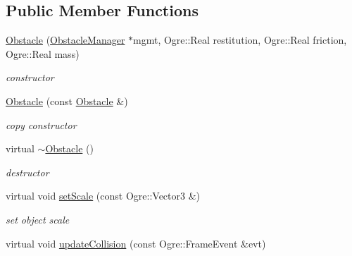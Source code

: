 \subsection*{Public Member Functions}
\begin{DoxyCompactItemize}
\item 
\hyperlink{class_n_c_t_u_1_1_obstacle_abc03dea67c7426eea315a1ac4da8c78d}{Obstacle} (\hyperlink{class_n_c_t_u_1_1_obstacle_manager}{Obstacle\+Manager} $\ast$mgmt, Ogre\+::\+Real restitution, Ogre\+::\+Real friction, Ogre\+::\+Real mass)\hypertarget{class_n_c_t_u_1_1_obstacle_abc03dea67c7426eea315a1ac4da8c78d}{}\label{class_n_c_t_u_1_1_obstacle_abc03dea67c7426eea315a1ac4da8c78d}

\begin{DoxyCompactList}\small\item\em constructor \end{DoxyCompactList}\item 
\hyperlink{class_n_c_t_u_1_1_obstacle_af96593944da2a5873cdacbd8ff54f076}{Obstacle} (const \hyperlink{class_n_c_t_u_1_1_obstacle}{Obstacle} \&)\hypertarget{class_n_c_t_u_1_1_obstacle_af96593944da2a5873cdacbd8ff54f076}{}\label{class_n_c_t_u_1_1_obstacle_af96593944da2a5873cdacbd8ff54f076}

\begin{DoxyCompactList}\small\item\em copy constructor \end{DoxyCompactList}\item 
virtual \hyperlink{class_n_c_t_u_1_1_obstacle_af2f9cc9c6cff75dca0974fd5ac4f71a9}{$\sim$\+Obstacle} ()\hypertarget{class_n_c_t_u_1_1_obstacle_af2f9cc9c6cff75dca0974fd5ac4f71a9}{}\label{class_n_c_t_u_1_1_obstacle_af2f9cc9c6cff75dca0974fd5ac4f71a9}

\begin{DoxyCompactList}\small\item\em destructor \end{DoxyCompactList}\item 
virtual void \hyperlink{class_n_c_t_u_1_1_obstacle_a12e49360d558e8a875651f212698f3bd}{set\+Scale} (const Ogre\+::\+Vector3 \&)\hypertarget{class_n_c_t_u_1_1_obstacle_a12e49360d558e8a875651f212698f3bd}{}\label{class_n_c_t_u_1_1_obstacle_a12e49360d558e8a875651f212698f3bd}

\begin{DoxyCompactList}\small\item\em set object scale \end{DoxyCompactList}\item 
virtual void \hyperlink{class_n_c_t_u_1_1_obstacle_ad36f7e057a1067bc71dbaf4cef8c7b31}{update\+Collision} (const Ogre\+::\+Frame\+Event \&evt)\hypertarget{class_n_c_t_u_1_1_obstacle_ad36f7e057a1067bc71dbaf4cef8c7b31}{}\label{class_n_c_t_u_1_1_obstacle_ad36f7e057a1067bc71dbaf4cef8c7b31}


\end{DoxyCompactItemize}
